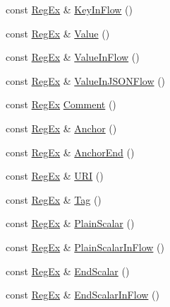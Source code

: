 \begin{DoxyCompactItemize}
\item 
const \mbox{\hyperlink{class_y_a_m_l_1_1_reg_ex}{Reg\+Ex}} \& \mbox{\hyperlink{namespace_y_a_m_l_1_1_exp_ac922759fe8aee657aa3a4ef2769bf4ee}{Key\+In\+Flow}} ()
\item 
const \mbox{\hyperlink{class_y_a_m_l_1_1_reg_ex}{Reg\+Ex}} \& \mbox{\hyperlink{namespace_y_a_m_l_1_1_exp_a0c7f4cf978b1284708daaa8c1aafc037}{Value}} ()
\item 
const \mbox{\hyperlink{class_y_a_m_l_1_1_reg_ex}{Reg\+Ex}} \& \mbox{\hyperlink{namespace_y_a_m_l_1_1_exp_a95383376a158979a55d80a8ed734539f}{Value\+In\+Flow}} ()
\item 
const \mbox{\hyperlink{class_y_a_m_l_1_1_reg_ex}{Reg\+Ex}} \& \mbox{\hyperlink{namespace_y_a_m_l_1_1_exp_a9dfedb0d45b64fffb7645638dfafc217}{Value\+In\+J\+S\+O\+N\+Flow}} ()
\item 
const \mbox{\hyperlink{class_y_a_m_l_1_1_reg_ex}{Reg\+Ex}} \mbox{\hyperlink{namespace_y_a_m_l_1_1_exp_a039d4627f63ee8bb7b73f3fe268f67d3}{Comment}} ()
\item 
const \mbox{\hyperlink{class_y_a_m_l_1_1_reg_ex}{Reg\+Ex}} \& \mbox{\hyperlink{namespace_y_a_m_l_1_1_exp_aa5626ff2fafa6d98d0118f12e4db6efc}{Anchor}} ()
\item 
const \mbox{\hyperlink{class_y_a_m_l_1_1_reg_ex}{Reg\+Ex}} \& \mbox{\hyperlink{namespace_y_a_m_l_1_1_exp_a2f3bd5ab82bf10a31b2ca262220fa01d}{Anchor\+End}} ()
\item 
const \mbox{\hyperlink{class_y_a_m_l_1_1_reg_ex}{Reg\+Ex}} \& \mbox{\hyperlink{namespace_y_a_m_l_1_1_exp_ad41709a16ebd6dcaa8c69791e4b2960b}{U\+RI}} ()
\item 
const \mbox{\hyperlink{class_y_a_m_l_1_1_reg_ex}{Reg\+Ex}} \& \mbox{\hyperlink{namespace_y_a_m_l_1_1_exp_ab9757a8ce0e5d0c85a9fc71f5256f32e}{Tag}} ()
\item 
const \mbox{\hyperlink{class_y_a_m_l_1_1_reg_ex}{Reg\+Ex}} \& \mbox{\hyperlink{namespace_y_a_m_l_1_1_exp_a095399f1d1b6b07ea099fdccb163a050}{Plain\+Scalar}} ()
\item 
const \mbox{\hyperlink{class_y_a_m_l_1_1_reg_ex}{Reg\+Ex}} \& \mbox{\hyperlink{namespace_y_a_m_l_1_1_exp_af5cf91fb6ffbc3274d373ea24882e0f5}{Plain\+Scalar\+In\+Flow}} ()
\item 
const \mbox{\hyperlink{class_y_a_m_l_1_1_reg_ex}{Reg\+Ex}} \& \mbox{\hyperlink{namespace_y_a_m_l_1_1_exp_a2ac2c0875035b421788e9799f8b75ed7}{End\+Scalar}} ()
\item 
const \mbox{\hyperlink{class_y_a_m_l_1_1_reg_ex}{Reg\+Ex}} \& \mbox{\hyperlink{namespace_y_a_m_l_1_1_exp_aaa8f952eabc0b7cc8cccfe03ab563ce5}{End\+Scalar\+In\+Flow}} ()

\end{DoxyCompactItemize}
